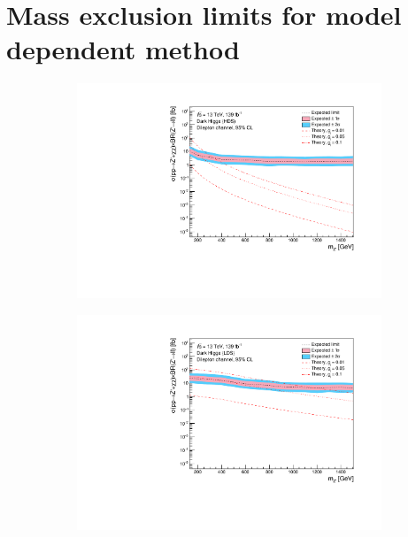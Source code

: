 \documentclass[12pt, a4paper]{book}
\begin{document}
\clearpage
\section{Mass exclusion limits for model dependent method}\label{fig:model_dep_exclusions}
\begin{figure}[!ht]
	\centering
	\begin{subfigure}[b]{0.49\textwidth}
      \centering
      \includegraphics[width=1\textwidth]{Limits/DH_HDS/mass_exclusion_comb.pdf}
   \end{subfigure}
   \hfill
   \begin{subfigure}[b]{0.49\textwidth}
      \centering
      \includegraphics[width=1\textwidth]{Limits/DH_LDS/mass_exclusion_comb.pdf}
   \end{subfigure}
   \hfill
   \begin{subfigure}[b]{0.49\textwidth}

\end{subfigure}
\end{figure}
\end{document}
